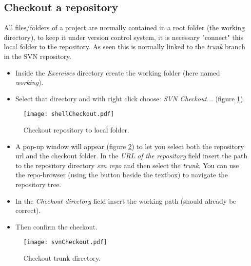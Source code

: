 \subsection{Checkout a repository}
\label{subsection:CheckoutRepo}


All files/folders of a project are normally contained in a root folder (the working directory), to keep it under version control system, it is necessary "connect" this local folder to the repository. As seen this is normally linked to the \textit{trunk} branch in the SVN repository.



\begin{itemize}
    \item Inside the \textit{Exercises} directory create the working folder (here named \textit{working}).

    \item Select that directory and with right click choose: \textit{SVN Checkout...} (figure \ref{fig:shellCheckout}).
\end{itemize}


\begin{figure}[htbp]
    \centering
    \texttt{[image: shellCheckout.pdf]}
    \caption{Checkout repository to local folder.}
    \label{fig:shellCheckout}
\end{figure}


\begin{itemize}
    \item A pop-up window will appear (figure \ref{fig:svnCheckout}) to let you select both the repository url and the checkout folder. In the \textit{URL of the repository} field insert the path to the repository directory \textit{svn repo} and then select the \textit{trunk}. You can use the repo-browser (using the button beside the textbox) to navigate the repository tree.
    
    \item In the \textit{Checkout directory} field insert the working path (should already be correct).
    
    \item Then confirm the checkout.
\end{itemize}


\begin{figure}[htbp]
    \centering
    \texttt{[image: svnCheckout.pdf]}
    \caption{Checkout trunk directory.}
    \label{fig:svnCheckout}
\end{figure}


